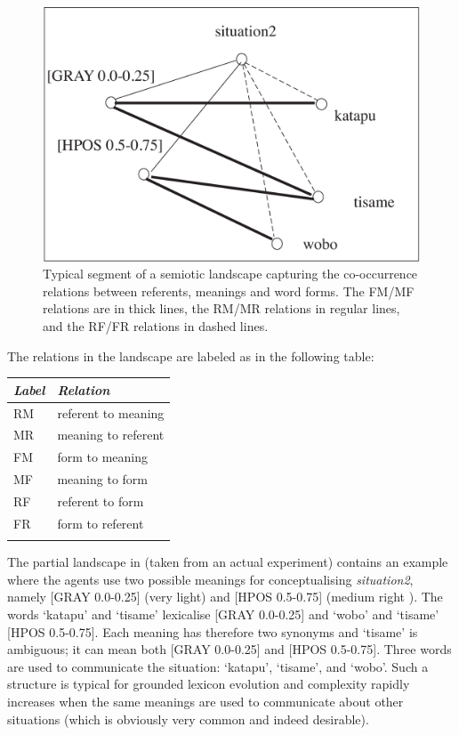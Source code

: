 \begin{figure}[htbp]
  \centerline{\includegraphics[width=.65\textwidth]{chap7/figs/landscape}}
\caption{ \label{RMF1} Typical segment of a semiotic
landscape capturing the co-occurrence relations between
referents, meanings and word forms. The FM/MF relations are
in thick lines, the RM/MR relations in regular lines, and 
the RF/FR relations in dashed lines.}
\end{figure}
The relations in the landscape are labeled as in 
the following table:
\begin{center}
\begin{tabular}{ l  l  }
\lsptoprule
{\itshape Label}& {\itshape Relation } \\ \midrule
RM & referent to meaning \\ 
MR & meaning to referent \\ 
FM & form to meaning\\ 
MF & meaning to form\\ 
RF & referent to form \\ 
FR & form to referent  \\ 
\lspbottomrule
\end{tabular}
\end{center}

The partial landscape in  (taken from
an actual experiment) contains an example where the agents use
two possible meanings for conceptualising {\itshape situation2}, namely
[GRAY 0.0-0.25] (very light) and [HPOS 0.5-0.75]
(medium right ). The words `katapu' and `tisame' lexicalise
[GRAY 0.0-0.25] and `wobo' and `tisame' [HPOS 0.5-0.75]. 
Each meaning has therefore two synonyms and `tisame' is 
ambiguous; it can mean both [GRAY 0.0-0.25]
and [HPOS 0.5-0.75]. Three words
are used to communicate the situation: `katapu', `tisame', 
and `wobo'. Such a structure is typical for grounded
lexicon evolution and complexity rapidly increases when the
same meanings are used to communicate about other
situations (which is obviously very common and indeed desirable). 

